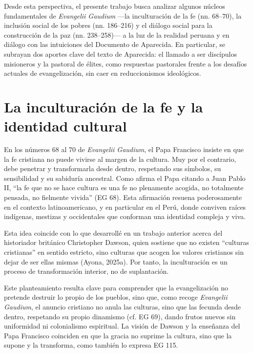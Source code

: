\documentclass[12pt]{article}
\begin{document}
	Desde esta perspectiva, el presente trabajo busca analizar algunos núcleos fundamentales de \textit{Evangelii Gaudium} —la inculturación de la fe (nn. 68–70), la inclusión social de los pobres (nn. 186–216) y el diálogo social para la construcción de la paz (nn. 238–258)— a la luz de la realidad peruana y en diálogo con las intuiciones del Documento de Aparecida. En particular, se subrayan dos aportes clave del texto de Aparecida: el llamado a ser discípulos misioneros y la pastoral de élites, como respuestas pastorales frente a los desafíos actuales de evangelización, sin caer en reduccionismos ideológicos.
	
	\section{La inculturación de la fe y la identidad cultural}
	
	En los números 68 al 70 de \textit{Evangelii Gaudium}, el Papa Francisco insiste en que la fe cristiana no puede vivirse al margen de la cultura. Muy por el contrario, debe penetrar y transformarla desde dentro, respetando sus símbolos, su sensibilidad y su sabiduría ancestral. Como afirma el Papa citando a Juan Pablo II, “la fe que no se hace cultura es una fe no plenamente acogida, no totalmente pensada, no fielmente vivida” (EG 68). Esta afirmación resuena poderosamente en el contexto latinoamericano, y en particular en el Perú, donde conviven raíces indígenas, mestizas y occidentales que conforman una identidad compleja y viva.
	
	Esta idea coincide con lo que desarrollé en un trabajo anterior acerca del historiador británico Christopher Dawson, quien sostiene que no existen “culturas cristianas” en sentido estricto, sino culturas que acogen los valores cristianos sin dejar de ser ellas mismas (Ayona, 2025a)\nocite{Ayona2025a}. Por tanto, la inculturación es un proceso de transformación interior, no de suplantación.
	
	Este planteamiento resulta clave para comprender que la evangelización no pretende destruir lo propio de los pueblos, sino que, como recoge \textit{Evangelii Gaudium}, el anuncio cristiano no anula las culturas, sino que las fecunda desde dentro, respetando su propio dinamismo (cf. EG 69), dando frutos nuevos sin uniformidad ni colonialismo espiritual. La visión de Dawson y la enseñanza del Papa Francisco coinciden en que la gracia no suprime la cultura, sino que la supone y la transforma, como también lo expresa EG 115.
	
\end{document}
